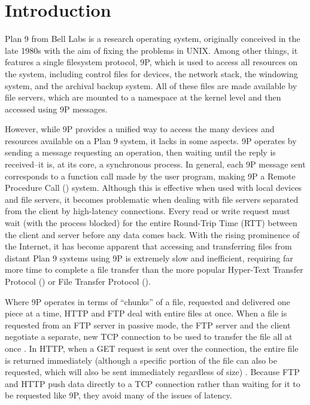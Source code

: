 \documentclass[11pt,american]{report}
\begin{document}

\body%
\chapter{Introduction}
Plan 9 from Bell Labs is a research operating system, originally conceived in the late 1980s with the aim of fixing the problems in UNIX\texttrademark \cite{Pike95:PBL}. Among other things, it features a single filesystem protocol, 9P, which is used to access all resources on the system, including control files for devices, the network stack, the windowing system, and the archival backup system. All of these files are made available by file servers, which are mounted to a namespace at the kernel level and then accessed using 9P messages.

However, while 9P provides a unified way to access the many devices and resources available on a Plan 9 system, it lacks in some aspects. 9P operates by sending a message requesting an operation, then waiting until the reply is received--it is, at its core, a synchronous process. In general, each 9P message sent corresponds to a function call made by the user program, making 9P a Remote Procedure Call () system. Although this is effective when used with local devices and file servers, it becomes problematic when dealing with file servers separated from the client by high-latency connections. Every read or write request must wait (with the process blocked) for the entire Round-Trip Time (RTT) between the client and server before any data comes back. With the rising prominence of the Internet, it has become apparent that accessing and transferring files from distant Plan 9 systems using 9P is extremely slow and inefficient, requiring far more time to complete a file transfer than the more popular Hyper-Text Transfer Protocol () or File Transfer Protocol ().

Where 9P operates in terms of ``chunks'' of a file, requested and delivered one piece at a time, HTTP and FTP deal with entire files at once. When a file is requested from an FTP server in passive mode, the FTP server and the client negotiate a separate, new TCP connection to be used to transfer the file all at once \cite{FTPrfc}. In HTTP, when a GET request is sent over the connection, the entire file is returned immediately (although a specific portion of the file can also be requested, which will also be sent immediately regardless of size) \cite{HTTPrfc}. Because FTP and HTTP push data directly to a TCP connection rather than waiting for it to be requested like 9P, they avoid many of the issues of latency.
\end{document}
